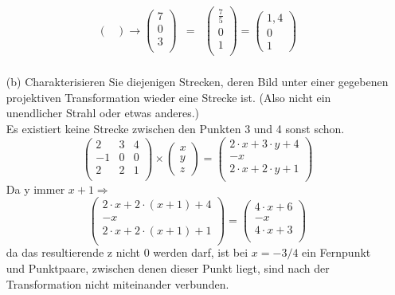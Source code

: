 \documentclass[11pt]{article}
\begin{document}
\begin{enumerate}
\begin{eqnarray*}
\begin{pmatrix}
\end{pmatrix}
\rightarrow
\begin{pmatrix}
7 \\ 0 \\ 3 \\
\end{pmatrix}
&=&
\begin{pmatrix}
\frac{7}{5} \\ 0 \\ 1 \\
\end{pmatrix}
=
\begin{pmatrix}
1,4 \\ 0 \\ 1
\end{pmatrix}\\
\end{eqnarray*} 
\item[(b)] Charakterisieren Sie diejenigen Strecken, deren Bild unter einer gegebenen projektiven Transformation wieder eine Strecke ist. (Also nicht ein unendlicher Strahl oder etwas anderes.)\\
Es existiert keine Strecke zwischen den Punkten 3 und 4 sonst schon.
$$
\begin{pmatrix}
2 & 3 &  4 \\
-1 & 0 & 0 \\
2 & 2 & 1 \\
\end{pmatrix}
\times
\begin{pmatrix}
x \\ y \\ z
\end{pmatrix} 
= 
\begin{pmatrix}
2 \cdot x + 3 \cdot y + 4 \\
-x\\
2 \cdot x + 2 \cdot y + 1 \\
\end{pmatrix}
$$
Da y immer $x + 1 \Rightarrow $
$$
\begin{pmatrix}
2 \cdot x + 2 \cdot (x + 1) + 4\\
-x \\
2 \cdot x + 2 \cdot (x + 1) + 1\\
\end{pmatrix}
=
\begin{pmatrix}
4 \cdot x + 6 \\
-x\\
4 \cdot x + 3 \\
\end{pmatrix}
$$
da das resultierende z nicht 0 werden darf, ist bei $x = -3/4$ ein Fernpunkt und Punktpaare, zwischen denen dieser Punkt liegt, sind nach der Transformation nicht miteinander verbunden.
\end{enumerate}
\end{document}
